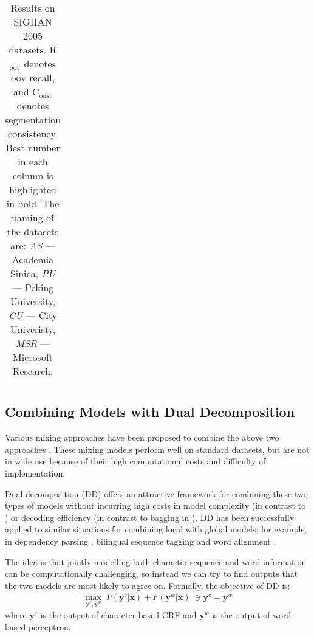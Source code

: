 \begin{table*}
\begin{small}
\begin{tabular}{ r | c | c | c | c | c | c | c | c | c | c  }
\end{tabular} 
\caption{Results on SIGHAN 2005 datasets. {R$_{\mathrm{oov}}$}  denotes \textsc{oov} recall, and C$_{\mathrm{onst}}$ denotes segmentation consistency. Best number in each column is highlighted in bold. The naming of the datasets are: \emph{AS} --- Academia Sinica, \emph{PU} --- Peking University, \emph{CU} --- City Univeristy, \emph{MSR} ---  Microsoft Research.
}\label{tbl:results}
\end{small}
\end{table*}

\subsection{Combining Models with Dual Decomposition} 
Various mixing approaches have been proposed to combine the above two approaches \cite{Wang:2006:SIGHAN,Lin:2009:CICLing,Sun:2009:HLT-NAACL,Sun:2010:COLING,Wang:2010:COLING}. 
These mixing models perform well on standard datasets, but are not in wide use because of their high computational costs and difficulty of implementation.

Dual decomposition (DD) \cite{Rush:2010:EMNLP} offers an attractive framework for combining these two types of models without incurring high costs in model complexity (in contrast to \cite{Sun:2009:HLT-NAACL}) or decoding efficiency (in contrast to bagging in \cite{Wang:2006:SIGHAN,Sun:2010:COLING}). DD has been successfully applied to similar situations for combining local with global models; for example, in dependency parsing \cite{Koo:2010:EMNLP}, bilingual sequence tagging \cite{Wang:2013:ACL} and word alignment \cite{Denero:2011:ACL}.  

The idea is that jointly modelling both character-sequence and word information can be computationally challenging, so instead we can try to find outputs that the two models are most likely to agree on.
Formally, the objective of DD is:
\begin{align*}
   \max_{\mathbf{y^\textit{c}}, \mathbf{y^\textit{w}}}  \; P(\mathbf{y^\textit{c}} | \mathbf{x}) + F(\mathbf{y^\textit{w}} | \mathbf{x}) \;  \ni \mathbf{y^\textit{c}} = \mathbf{y^\textit{w}}
\end{align*}
\noindent where $\mathbf{y^\textit{c}}$ is the output of character-based CRF and $\mathbf{y^\textit{w}}$ is the output of word-based perceptron.

